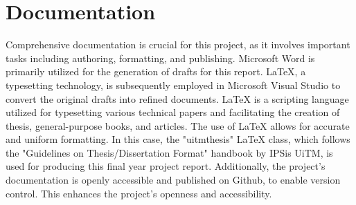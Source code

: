 \section{Documentation}
Comprehensive documentation is crucial for this project, as it involves important tasks including authoring, formatting, and publishing. Microsoft Word is primarily utilized for the generation of drafts for this report. LaTeX, a typesetting technology, is subsequently employed in Microsoft Visual Studio to convert the original drafts into refined documents. LaTeX is a scripting language utilized for typesetting various technical papers and facilitating the creation of thesis, general-purpose books, and articles. The use of LaTeX allows for accurate and uniform formatting. In this case, the "uitmthesis" LaTeX class, which follows the "Guidelines on Thesis/Dissertation Format" handbook by IPSis UiTM, is used for producing this final year project report. Additionally, the project's documentation is openly accessible and published on Github, to enable version control. This enhances the project's openness and accessibility.
\pagebreak